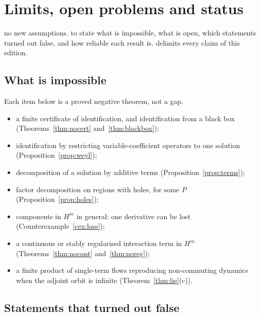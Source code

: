\chapter{Limits, open problems and status}\label{ch:status}
\chapterbrief
{no new assumptions.}
{to state what is impossible, what is open, which statements turned out false, and how reliable each result is.}
{delimits every claim of this edition.}

\section{What is impossible}

Each item below is a proved negative theorem, not a gap.
\begin{itemize}
\item a finite certificate of identification, and identification from a black box (Theorems~\ref{thm:nocert} and~\ref{thm:blackbox});
\item identification by restricting variable-coefficient operators to one solution (Proposition~\ref{prop:weyl});
\item decomposition of a solution by additive terms (Proposition~\ref{prop:terms});
\item factor decomposition on regions with holes, for some $P$ (Proposition~\ref{prop:holes});
\item components in $H^m$ in general: one derivative can be lost (Counterexample~\ref{cex:loss});
\item a continuous or stably regularised interaction term in $H^m$ (Theorems~\ref{thm:nocont} and~\ref{thm:noreg});
\item a finite product of single-term flows reproducing non-commuting dynamics when the adjoint orbit is infinite (Theorem~\ref{thm:lie}(c)).
\end{itemize}

\section{Statements that turned out false}

